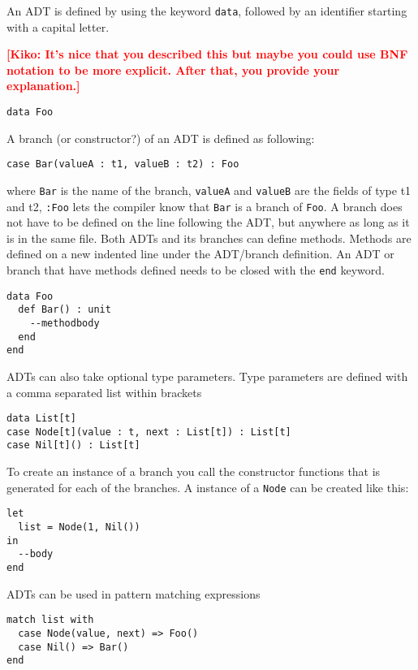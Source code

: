 \documentclass[10pt]{report}
\newcommand{\KIKO}[1]{\textcolor{red}{\textbf{[Kiko: #1]}}}
\begin{document}
\par{\noindent An ADT is defined by using the keyword \texttt{data}, followed by an identifier starting with a capital letter.}

\KIKO{It's nice that you described this but maybe you could use BNF notation to be more explicit. After that, you provide your explanation.}

\begin{lstlisting}[language=Encore]
data Foo
\end{lstlisting}
A branch (or constructor?) of an ADT is defined as following:
\begin{lstlisting}[language=Encore]
case Bar(valueA : t1, valueB : t2) : Foo
\end{lstlisting}
where \texttt{Bar} is the name of the branch, \texttt{valueA} and \texttt{valueB} are the fields of type t1 and t2, \texttt{:Foo} lets the compiler know that \texttt{Bar} is a branch of \texttt{Foo}.
A branch does not have to be defined on the line following the ADT, but anywhere as long as it is in the same file.
Both ADTs and its branches can define methods. Methods are defined on a new indented line under the ADT/branch definition.
An ADT or branch that have methods defined needs to be closed with the \texttt{end} keyword.
\begin{lstlisting}[language=encore,caption={ADT definition with a method}]
data Foo
  def Bar() : unit
    --methodbody
  end
end
\end{lstlisting}
ADTs can also take optional type parameters. Type parameters are defined with a comma separated list within brackets
\begin{lstlisting}[language=encore,caption={Generic linked list implemented with an ADT}]
data List[t]
case Node[t](value : t, next : List[t]) : List[t]
case Nil[t]() : List[t]
\end{lstlisting}
To create an instance of a branch you call the constructor functions that is generated for each of the branches.
A instance of a \texttt{Node} can be created like this:
\begin{lstlisting}[language=encore,caption={Declaration of a list containing one element}]
let
  list = Node(1, Nil())
in
  --body
end
\end{lstlisting}
ADTs can be used in pattern matching expressions
\begin{lstlisting}[language=encore,caption={Pattern matching on a linked list}]
match list with
  case Node(value, next) => Foo()
  case Nil() => Bar()
end
\end{lstlisting}
\end{document}
